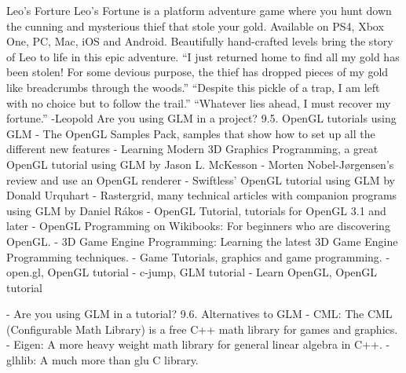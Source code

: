 \documentclass{scrartcl}
\numberwithin{figure}{subsection}
\begin{document}
          
Leo's Forture 
Leo's Fortune is a platform adventure game where you hunt down the cunning and mysterious thief that stole your gold. Available on PS4, Xbox One, PC, Mac, iOS and Android.
Beautifully hand-crafted levels bring the story of Leo to life in this epic adventure. 
“I just returned home to find all my gold has been stolen! For some devious purpose, the thief has dropped pieces of my gold like breadcrumbs through the woods.”
“Despite this pickle of a trap, I am left with no choice but to follow the trail.” 
“Whatever lies ahead, I must recover my fortune.” -Leopold
Are you using GLM in a project?
9.5. OpenGL tutorials using GLM 
- The OpenGL Samples Pack, samples that show how to set up all the different new features
- Learning Modern 3D Graphics Programming, a great OpenGL tutorial using GLM by Jason L. McKesson
- Morten Nobel-Jørgensen's review and use an OpenGL renderer 
- Swiftless' OpenGL tutorial using GLM by Donald Urquhart
- Rastergrid, many technical articles with companion programs using GLM by Daniel Rákos
- OpenGL Tutorial, tutorials for OpenGL 3.1 and later
- OpenGL Programming on Wikibooks: For beginners who are discovering OpenGL.
- 3D Game Engine Programming: Learning the latest 3D Game Engine Programming techniques.
- Game Tutorials, graphics and game programming. 
- open.gl, OpenGL tutorial
- c-jump, GLM tutorial
- Learn OpenGL, OpenGL tutorial

- Are you using GLM in a tutorial?
9.6. Alternatives to GLM
- CML: The CML (Configurable Math Library) is a free C++ math library for games and graphics.
- Eigen: A more heavy weight math library for general linear algebra in C++.
- glhlib: A much more than glu C library.
\end{document}
